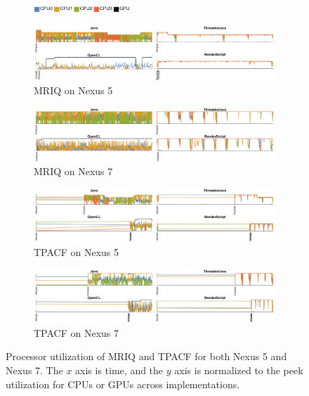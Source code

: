 \begin{figure}
  \centering

  \begin{subfigure}[b]{\textwidth}
          \centering
          \includegraphics[width=0.4\textwidth]{data/load_legend.pdf}
  \end{subfigure}

  \begin{subfigure}[b]{\textwidth}
      \centering
      \includegraphics[width=\textwidth]{data/load_mriq_nexus5.pdf}
      \caption{MRIQ on Nexus 5}
      \label{fig:MRIQ5}
  \end{subfigure}
  \begin{subfigure}[b]{\textwidth}
      \centering
      \includegraphics[width=\textwidth]{data/load_mriq_nexus7.pdf}
      \caption{MRIQ on Nexus 7}
      \label{fig:MRIQ7}
  \end{subfigure}

  \begin{subfigure}[b]{\textwidth}
      \centering
      \includegraphics[width=\textwidth]{data/load_tpacf_nexus5.pdf}
      \caption{TPACF on Nexus 5}
      \label{fig:TPACF5}
  \end{subfigure}
  \begin{subfigure}[b]{\textwidth}
      \centering
      \includegraphics[width=\textwidth]{data/load_tpacf_nexus7.pdf}
      \caption{TPACF on Nexus 7}
      \label{fig:TPACF7}
  \end{subfigure}

  \caption{Processor utilization of MRIQ and TPACF for both Nexus 5 and Nexus 7. The $x$ axis is time, and the $y$ axis is normalized to the peek utilization for CPUs or GPUs across implementations.}
  \label{fig:loadMRIQTpacf}
\end{figure}

